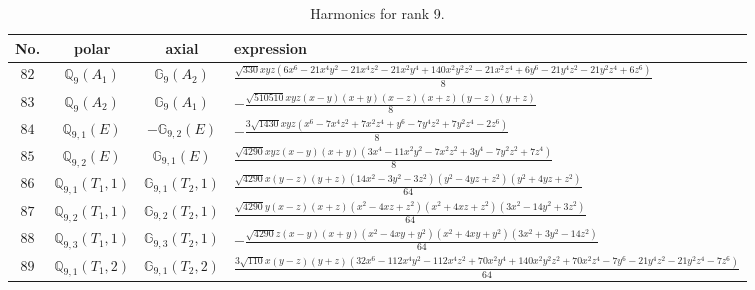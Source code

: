\documentclass[fleqn,8pt,landscape]{jsarticle}
\begin{document}
\begin{table}[ht!]
\begin{center}
\caption{Harmonics for rank 9.}
\renewcommand{\arraystretch}{1.3}
\begin{tabular}{cccl} \hline \hline
No. & polar & axial & expression \\ \hline
$ 82 $ & $ \mathbb{Q}_{9}(A_{1}) $ & $ \mathbb{G}_{9}(A_{2}) $ & $ \frac{\sqrt{330} x y z \left(6 x^{6} - 21 x^{4} y^{2} - 21 x^{4} z^{2} - 21 x^{2} y^{4} + 140 x^{2} y^{2} z^{2} - 21 x^{2} z^{4} + 6 y^{6} - 21 y^{4} z^{2} - 21 y^{2} z^{4} + 6 z^{6}\right)}{8} $ \\
$ 83 $ & $ \mathbb{Q}_{9}(A_{2}) $ & $ \mathbb{G}_{9}(A_{1}) $ & $ - \frac{\sqrt{510510} x y z \left(x - y\right) \left(x + y\right) \left(x - z\right) \left(x + z\right) \left(y - z\right) \left(y + z\right)}{8} $ \\
$ 84 $ & $ \mathbb{Q}_{9,1}(E) $ & $ -\mathbb{G}_{9,2}(E) $ & $ - \frac{3 \sqrt{1430} x y z \left(x^{6} - 7 x^{4} z^{2} + 7 x^{2} z^{4} + y^{6} - 7 y^{4} z^{2} + 7 y^{2} z^{4} - 2 z^{6}\right)}{8} $ \\
$ 85 $ & $ \mathbb{Q}_{9,2}(E) $ & $ \mathbb{G}_{9,1}(E) $ & $ \frac{\sqrt{4290} x y z \left(x - y\right) \left(x + y\right) \left(3 x^{4} - 11 x^{2} y^{2} - 7 x^{2} z^{2} + 3 y^{4} - 7 y^{2} z^{2} + 7 z^{4}\right)}{8} $ \\
$ 86 $ & $ \mathbb{Q}_{9,1}(T_{1},1) $ & $ \mathbb{G}_{9,1}(T_{2},1) $ & $ \frac{\sqrt{4290} x \left(y - z\right) \left(y + z\right) \left(14 x^{2} - 3 y^{2} - 3 z^{2}\right) \left(y^{2} - 4 y z + z^{2}\right) \left(y^{2} + 4 y z + z^{2}\right)}{64} $ \\
$ 87 $ & $ \mathbb{Q}_{9,2}(T_{1},1) $ & $ \mathbb{G}_{9,2}(T_{2},1) $ & $ \frac{\sqrt{4290} y \left(x - z\right) \left(x + z\right) \left(x^{2} - 4 x z + z^{2}\right) \left(x^{2} + 4 x z + z^{2}\right) \left(3 x^{2} - 14 y^{2} + 3 z^{2}\right)}{64} $ \\
$ 88 $ & $ \mathbb{Q}_{9,3}(T_{1},1) $ & $ \mathbb{G}_{9,3}(T_{2},1) $ & $ - \frac{\sqrt{4290} z \left(x - y\right) \left(x + y\right) \left(x^{2} - 4 x y + y^{2}\right) \left(x^{2} + 4 x y + y^{2}\right) \left(3 x^{2} + 3 y^{2} - 14 z^{2}\right)}{64} $ \\
$ 89 $ & $ \mathbb{Q}_{9,1}(T_{1},2) $ & $ \mathbb{G}_{9,1}(T_{2},2) $ & $ \frac{3 \sqrt{110} x \left(y - z\right) \left(y + z\right) \left(32 x^{6} - 112 x^{4} y^{2} - 112 x^{4} z^{2} + 70 x^{2} y^{4} + 140 x^{2} y^{2} z^{2} + 70 x^{2} z^{4} - 7 y^{6} - 21 y^{4} z^{2} - 21 y^{2} z^{4} - 7 z^{6}\right)}{64} $ \\

\end{tabular}
\end{center}
\end{table}
\end{document}
